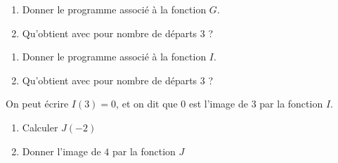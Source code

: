 \begin{frame}
    \vspace*{1em}

    \begin{enumerate}
        \item Donner le programme associé  à la fonction $G$.
        \item Qu'obtient avec pour nombre de départs 3 ?
    \end{enumerate}
    \vfill
\end{frame}

\begin{frame}
    \vspace*{1em}

    \begin{enumerate}
        \item Donner le programme associé  à la fonction $I$.
        \item Qu'obtient avec pour nombre de départs 3 ?
    \end{enumerate}
    \vspace*{1em}

    On peut écrire $I(3)=0$, et on dit que 0 est l'image de 3 par la fonction $I$.
    \vfill
\end{frame}

\begin{frame}
    \vspace*{1em}

    \begin{enumerate}
        \item Calculer $J(-2)$
        \item Donner l'image de $4$ par la fonction $J$
    \end{enumerate}
\end{frame}
